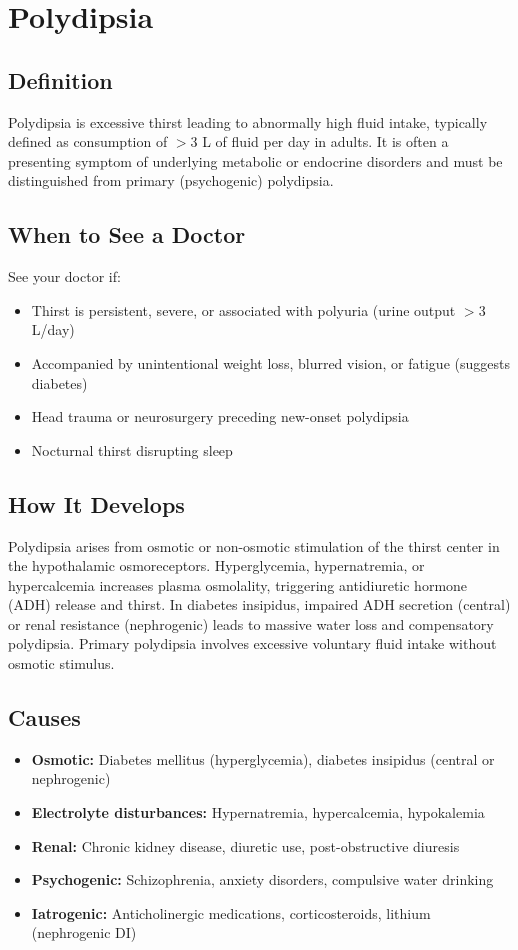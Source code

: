 \chapter{Polydipsia}

\section*{Definition}
Polydipsia is excessive thirst leading to abnormally high fluid intake, typically defined as consumption of \ensuremath{>}3 L of fluid per day in adults. It is often a presenting symptom of underlying metabolic or endocrine disorders and must be distinguished from primary (psychogenic) polydipsia.

\section*{When to See a Doctor}
See your doctor if:
\begin{itemize}
  \item Thirst is persistent, severe, or associated with polyuria (urine output \ensuremath{>}3 L/day)
  \item Accompanied by unintentional weight loss, blurred vision, or fatigue (suggests diabetes)
  \item Head trauma or neurosurgery preceding new-onset polydipsia
  \item Nocturnal thirst disrupting sleep
\end{itemize}

\section*{How It Develops}
Polydipsia arises from osmotic or non-osmotic stimulation of the thirst center in the hypothalamic osmoreceptors. Hyperglycemia, hypernatremia, or hypercalcemia increases plasma osmolality, triggering antidiuretic hormone (ADH) release and thirst. In diabetes insipidus, impaired ADH secretion (central) or renal resistance (nephrogenic) leads to massive water loss and compensatory polydipsia. Primary polydipsia involves excessive voluntary fluid intake without osmotic stimulus.

\section*{Causes}
\begin{itemize}
  \item \textbf{Osmotic:} Diabetes mellitus (hyperglycemia), diabetes insipidus (central or nephrogenic)
  \item \textbf{Electrolyte disturbances:} Hypernatremia, hypercalcemia, hypokalemia
  \item \textbf{Renal:} Chronic kidney disease, diuretic use, post-obstructive diuresis
  \item \textbf{Psychogenic:} Schizophrenia, anxiety disorders, compulsive water drinking
  \item \textbf{Iatrogenic:} Anticholinergic medications, corticosteroids, lithium (nephrogenic DI)
\end{itemize}

